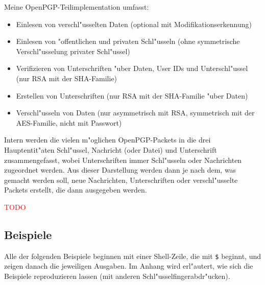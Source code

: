 \documentclass[12pt]{article}
\newcommand{\todo}[1]{\textcolor{red}{\mbox{TODO}}\marginpar{\textcolor{red}{#1}}}
\begin{document}
Meine OpenPGP-Teilimplementation umfasst:
\begin{itemize}
    \item Einlesen von verschl"usselten Daten (optional mit Modifikationserkennung)
    \item Einlesen von "offentlichen und privaten Schl"usseln (ohne symmetrische Verschl"usselung privater Schl"ussel)
    \item Verifizieren von Unterschriften "uber Daten, User IDs und Unterschl"ussel (nur RSA mit der SHA-Familie)
    \item Erstellen von Unterschriften (nur RSA mit der SHA-Familie "uber Daten)
    \item Verschl"usseln von Daten (nur asymmetrisch mit RSA, symmetrisch mit der AES-Familie, nicht mit Passwort)
\end{itemize}

Intern werden die vielen m"oglichen OpenPGP-Packets in die drei Hauptentit"aten
Schl"ussel, Nachricht (oder Datei) und Unterschrift zusammengefasst,
wobei Unterschriften immer Schl"usseln oder Nachrichten zugeordnet werden.
Aus dieser Darstellung werden dann je nach dem, was gemacht werden soll,
neue Nachrichten, Unterschriften oder verschl"usselte Packets erstellt,
die dann ausgegeben werden.

\todo{Mehr schreiben}

\subsection{Beispiele}
Alle der folgenden Beispiele beginnen mit einer Shell-Zeile, die mit \verb|$| beginnt,
und zeigen danach die jeweiligen Ausgaben.
Im Anhang wird erl"autert, wie sich die Beispiele reproduzieren lassen
(mit anderen Schl"usselfingerabdr"ucken).

\lstset{
breaklines,
basicstyle=\scriptsize\ttfamily,
}
\end{document}
